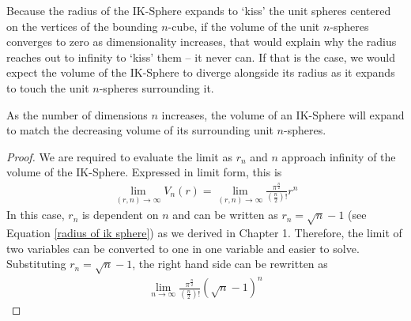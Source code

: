 Because the radius of the IK-Sphere expands to `kiss' the unit spheres centered on the vertices of the bounding $n$-cube, if the volume of the unit $n$-spheres converges to zero as dimensionality increases, that would explain why the radius reaches out to infinity to `kiss' them -- it never can. If that is the case, we would expect the volume of the IK-Sphere to diverge alongside its radius as it expands to touch the unit $n$-spheres surrounding it.

\begin{theorem}
As the number of dimensions $n$ increases, the volume of an IK-Sphere will expand to match the decreasing volume of its surrounding unit $n$-spheres. 
\end{theorem}

\begin{proof}
    We are required to evaluate the limit as $r_n$ and $n$ approach infinity of the volume of the IK-Sphere. Expressed in limit form, this is
    \begin{align*}
        \lim_{(r,n)\to\infty}V_n(r)=\lim_{(r,n)\to\infty}\frac{\pi^{\frac{n}{2}}}{\left(\frac{n}{2}\right)!}r^n
    \end{align*}
    In this case, $r_n$ is dependent on $n$ and can be written as $r_n=\sqrt{n}-1$ (see Equation \ref{radius of ik sphere}) as we derived in Chapter 1. Therefore, the limit of two variables can be converted to one in one variable and easier to solve. Substituting $r_n=\sqrt{n}-1$, the right hand side can be rewritten as
    \begin{align*}
        \lim_{n\to\infty}\frac{\pi^{\frac{n}{2}}}{\left(\frac{n}{2}\right)!}{\left(\sqrt{n}-1\right)}^n
    \end{align*}
    
    
    
\end{proof}